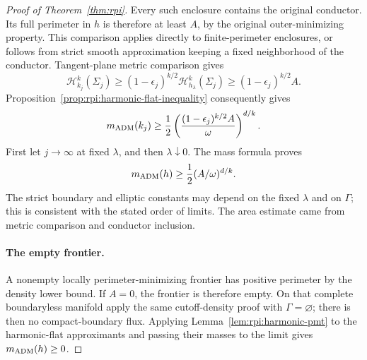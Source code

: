 \begin{proof}[Proof of Theorem~\ref{thm:rpi}]
Every such enclosure contains the original conductor. Its full
perimeter in \(h\) is therefore at least \(A\), by the original
outer-minimizing property. This comparison applies directly to
finite-perimeter enclosures, or follows from strict smooth
approximation keeping a fixed neighborhood of the conductor.
Tangent-plane metric comparison gives
\[
 \mathcal H_{k_j}^{k}(\Sigma_j)
 \ge(1-\epsilon_j)^{k/2}
       \mathcal H_{h_\lambda}^{k}(\Sigma_j)
 \ge(1-\epsilon_j)^{k/2} A .
\]
Proposition~\ref{prop:rpi:harmonic-flat-inequality} consequently gives
\[
 m_{\rm ADM}(k_j)\ge
 \frac12\left(
       \frac{(1-\epsilon_j)^{k/2}A}{\omega}
       \right)^{d/k}.
\]
First let \(j\to\infty\) at fixed \(\lambda\), and then
\(\lambda\downarrow0\). The mass formula proves
\[
 m_{\rm ADM}(h)\ge
       \frac12(A/\omega)^{d/k}.
\]
The strict boundary and elliptic constants may depend on the fixed
\(\lambda\) and on \(\Gamma\); this is consistent with the stated
order of limits. The area estimate came from metric comparison and
conductor inclusion.

\paragraph{The empty frontier.}
A nonempty locally perimeter-minimizing frontier has
positive perimeter by the density lower bound. If \(A=0\), the
frontier is therefore empty. On that complete boundaryless manifold
apply the same cutoff-density proof with \(\Gamma=\varnothing\);
there is then no compact-boundary flux. Applying
Lemma~\ref{lem:rpi:harmonic-pmt} to the harmonic-flat approximants
and passing their masses to the limit gives \(m_{\rm ADM}(h)\ge0\).
\end{proof}
